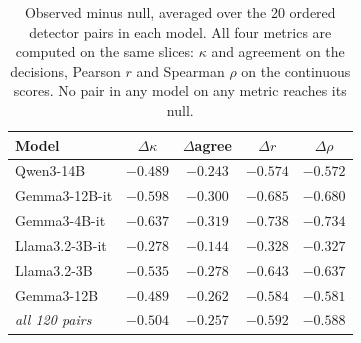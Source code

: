 \begin{table}[t]
  \centering
  \caption{Observed minus null, averaged over the 20 ordered detector pairs in
  each model. All four metrics are computed on the same slices: $\kappa$ and
  agreement on the decisions, Pearson $r$ and Spearman $\rho$ on the continuous
  scores. No pair in any model on any metric reaches its null.}
  \label{tab:conditional_gap}
  \footnotesize
  \begin{tabular}{l c c c c}
    \hline
    Model & $\Delta\kappa$ & $\Delta$agree & $\Delta r$ & $\Delta\rho$ \\
    \hline
    Qwen3-14B & $-0.489$ & $-0.243$ & $-0.574$ & $-0.572$ \\
    Gemma3-12B-it & $-0.598$ & $-0.300$ & $-0.685$ & $-0.680$ \\
    Gemma3-4B-it & $-0.637$ & $-0.319$ & $-0.738$ & $-0.734$ \\
    Llama3.2-3B-it & $-0.278$ & $-0.144$ & $-0.328$ & $-0.327$ \\
    Llama3.2-3B & $-0.535$ & $-0.278$ & $-0.643$ & $-0.637$ \\
    Gemma3-12B & $-0.489$ & $-0.262$ & $-0.584$ & $-0.581$ \\
    \hline
    \textit{all 120 pairs} & $\mathbf{-0.504}$ & $\mathbf{-0.257}$ & $\mathbf{-0.592}$ & $\mathbf{-0.588}$ \\
    \hline
  \end{tabular}
\end{table}
